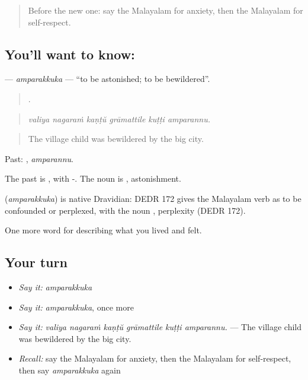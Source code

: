 \label{lesson:ML-C519-amparakkuka}



\begin{quote}
Before the new one: say the Malayalam for anxiety, then the Malayalam for self-respect.
\end{quote}

\subsection*{You'll want to know: }
\textbf{} — \emph{amparakkuka} — \textquotedblleft{}to be astonished; to be bewildered\textquotedblright{}.

\begin{quote}
     .
\end{quote}

\begin{quote}
\emph{valiya nagaraṁ kaṇṭŭ grāmattile kuṭṭi amparannu.}
\end{quote}

\begin{quote}
The village child was bewildered by the big city.
\end{quote}

Past: , \emph{amparannu}.

The past is , with -. The noun is , astonishment.

\begin{cousinweb}
\textbf{} (\emph{amparakkuka}) is native Dravidian: DEDR 172 gives the Malayalam verb as to be confounded or perplexed, with the noun , perplexity (DEDR 172).
\end{cousinweb}

\begin{grammarlens}[title={What you've built}]
One more word for describing what you lived and felt.
\end{grammarlens}

\subsection*{Your turn}
\begin{itemize}
\raggedright
  \item \emph{Say it:} \emph{amparakkuka}
  \item \emph{Say it:} \emph{amparakkuka}, once more
  \item \emph{Say it:} \emph{valiya nagaraṁ kaṇṭŭ grāmattile kuṭṭi amparannu.} — The village child was bewildered by the big city.
  \item \emph{Recall:} say the Malayalam for anxiety, then the Malayalam for self-respect, then say \emph{amparakkuka} again
\end{itemize}

